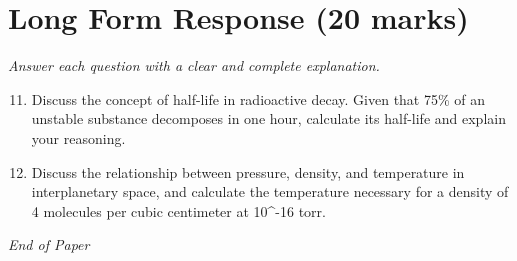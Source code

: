 \documentclass[12pt]{article}
\begin{document}
\section*{Long Form Response (20 marks)}
\textit{Answer each question with a clear and complete explanation.}
\begin{enumerate}[label=\arabic*.]
\setcounter{enumi}{10}
\item Discuss the concept of half-life in radioactive decay. Given that 75\% of an unstable substance decomposes in one hour, calculate its half-life and explain your reasoning.
\item Discuss the relationship between pressure, density, and temperature in interplanetary space, and calculate the temperature necessary for a density of 4 molecules per cubic centimeter at 10^-16 torr.
\end{enumerate}

\vfill
\noindent\textit{End of Paper}
\end{document}
